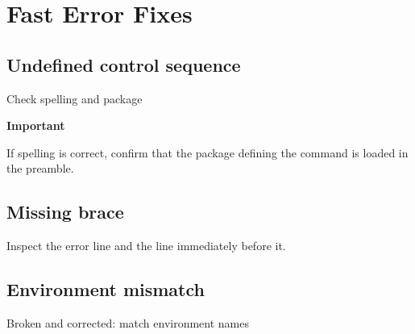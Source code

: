 \chapter{Fast Error Fixes}
\label{app:errors}

\section{Undefined control sequence}

\begin{latexcode}{Check spelling and package}

\textbf{Important}
\end{latexcode}

If spelling is correct, confirm that the package defining the command is
loaded in the preamble.

\section{Missing brace}

\begin{latexcode}{Broken and corrected: balance command arguments}
\section{Results

\section{Results}
\end{latexcode}

Inspect the error line and the line immediately before it.

\section{Environment mismatch}

\begin{latexcode}{Broken and corrected: match environment names}
\end{latexcode}

